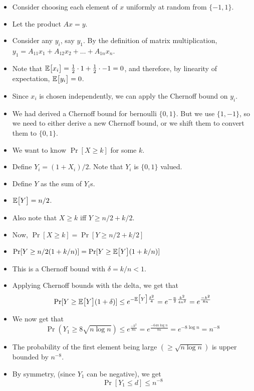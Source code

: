 \begin{itemize}
    \item Consider choosing each element of $x$ uniformly at random from $\{-1, 1\}$.
    \item Let the product $Ax = y$.
    \item Consider any $y_i$, say $y_1$. By the definition of matrix multiplication,
    $y_1 = A_{11} x_1 + A_{12} x_2 + \dots + A_{1n} x_n$.
    \item Note that $\mathbb{E}\big[ x_i \big] = \frac{1}{2} \cdot 1 + \frac{1}{2} \cdot -1 = 0$, and therefore, by linearity of expectation,
    $\mathbb{E}\big[ y_i \big] = 0$.
    \item Since $x_i$ is chosen independently, we can apply the Chernoff bound on $y_i$.
    \item We had derived a Chernoff bound for bernoulli $\{0, 1\}$. But we use
    $\{1, -1\}$, so we need to either derive a new Chernoff bound, or we shift
    them to convert them to $\{0, 1\}$.
    \item We want to know $\Pr[X \geq k]$ for some $k$.

    \item Define $Y_i = (1 + X_i) / 2$. Note that $Y_i$ is $\{0, 1\}$ valued.
    \item Define $Y$ as the sum of $Y_i$s.
    \item $\mathbb{E}\big[ Y \big] = n/2$.
    \item Also note that $X \geq k$ iff $Y \geq n/2 + k/2$.
    \item Now, $\Pr[X \geq k] = \Pr[Y \geq n/2 + k/2]$
    \item $\Pr[Y \geq n/2 (1 +  k/n)] = \Pr[Y \geq \mathbb{E}\big[ Y \big](1 + k / n)]$
    \item This is a Chernoff bound with $\delta = k/n < 1$.
    \item Applying Chernoff bounds with the delta, we get that
    $$
    \Pr[Y \geq \mathbb{E}\big[ Y \big](1 + \delta)] \leq e^{-\mathbb{E}\big[ Y \big] \frac{\delta^2}{4}} = e^{-\frac{n}{2} \frac{k^2}{4 n^2}} = e^{\frac{-k^2}{8n}}
    $$

    \item We now get that 
    $$
    \Pr(Y_1 \geq 8 \sqrt{n \log n}) \leq e^{\frac{-k^2}{8n}} = e^{\frac{-64 n \log n}{8n}} = e^{-8 \log n} = n^{-8}
    $$

    \item The probability of the first element being large 
    $(\geq \sqrt{n \log n})$ is upper bounded by $n^{-8}$.

    \item By symmetry, (since $Y_1$ can be negative), we get 
    $$
    \Pr[Y_1 \leq d] \leq n^{-8}
    $$


\end{itemize}
